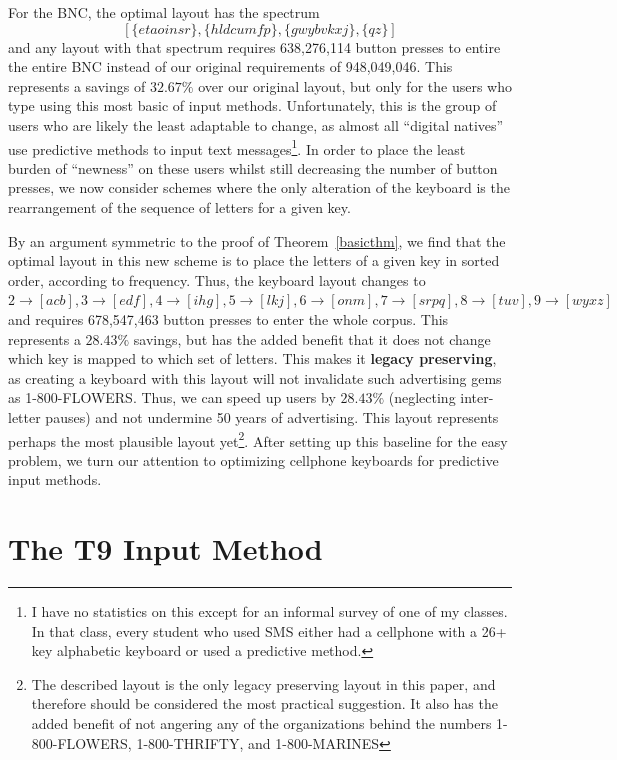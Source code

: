 \documentclass[runningheads]{llncs}
\newcommand{\newword}[1]{{\bf #1}}
\begin{document}
For the BNC, the optimal layout has the spectrum 
$$[\{etaoinsr\}, \{hldcumfp\}, \{gwybvkxj\}, \{qz\}]$$
and any layout with that spectrum requires 638,276,114 button presses to
entire the entire BNC instead of our original requirements of
948,049,046.  This represents a savings of $32.67\%$ over our original
layout, but only for the users who type using this most basic of
input methods.  Unfortunately, this is the group of users who are likely
the least adaptable to change, as almost all ``digital natives'' use 
predictive methods to input text messages\footnote{I have no statistics
on this except for an informal survey of one of my classes.  In that
class, every student who used SMS either had a cellphone with a 26+
key alphabetic keyboard or used a predictive method.}.  In order to place the
least burden of ``newness'' on these users whilst still decreasing the number
of button presses, we now consider schemes where the only alteration of the
keyboard is the rearrangement of the sequence of letters for a given key.

By an argument symmetric to the proof of Theorem~\ref{basicthm}, we find that
the optimal layout in this new scheme is to place the letters of a given key in
sorted order, according to frequency.  Thus, the keyboard layout changes to
$2\to[acb], 3\to[edf], 4\to[ihg], 5\to[lkj], 6\to[onm], 7\to[srpq], 8\to[tuv],
9\to[wyxz]$ and requires 678,547,463 button presses to enter the whole corpus.
This represents a $28.43\%$ savings, but has the added benefit that it does not
change which key is mapped to which set of letters.  This makes it
\newword{legacy preserving}, as creating a keyboard with this layout will not
invalidate such advertising gems as 1-800-FLOWERS.  Thus, we can speed up users
by $28.43\%$ (neglecting inter-letter pauses) and not undermine 50 years of
advertising.  This layout represents perhaps the most plausible layout
yet\footnote{The described layout is the only legacy preserving layout in this
paper, and therefore should be considered the most practical suggestion.  It
also has the added benefit of not angering any of the organizations behind the
numbers 1-800-FLOWERS, 1-800-THRIFTY, and 1-800-MARINES}.  After setting up
this baseline for the easy problem, we turn our attention to optimizing
cellphone keyboards for predictive input methods.

\section{The T9 Input Method}
\end{document}
